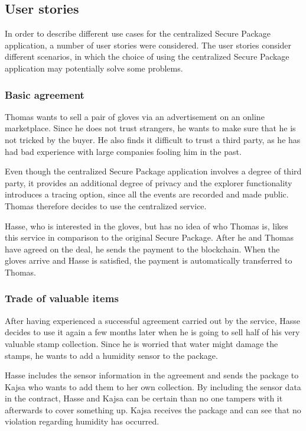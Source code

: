\subsection{User stories} \label{section:userstories}

In order to describe different use cases for the centralized Secure Package application, a number of user stories were considered. The user stories consider different scenarios, in which the choice of using the centralized Secure Package application may potentially solve some problems.

\subsubsection{Basic agreement}
Thomas wants to sell a pair of gloves via an advertisement on an online marketplace. Since he does not trust strangers, he wants to make sure that he is not tricked by the buyer. He also finds it difficult to trust a third party, as he has had bad experience with large companies fooling him in the past.

Even though the centralized Secure Package application involves a degree of third party, it provides an additional degree of privacy and the explorer functionality introduces a tracing option, since all the events are recorded and made public. Thomas therefore decides to use the centralized service.

Hasse, who is interested in the gloves, but has no idea of who Thomas is, likes this service in comparison to the original Secure Package. After he and Thomas have agreed on the deal, he sends the payment to the blockchain. When the gloves arrive and Hasse is satisfied, the payment is automatically transferred to Thomas.

\subsubsection{Trade of valuable items}
After having experienced a successful agreement carried out by the service, Hasse decides to use it again a few months later when he is going to sell half of his very valuable stamp collection. Since he is worried that water might damage the stamps, he wants to add a humidity sensor to the package.

Hasse includes the sensor information in the agreement and sends the package to Kajsa who wants to add them to her own collection. By including the sensor data in the contract, Hasse and Kajsa can be certain than no one tampers with it afterwards to cover something up. Kajsa receives the package and can see that no violation regarding humidity has occurred.


